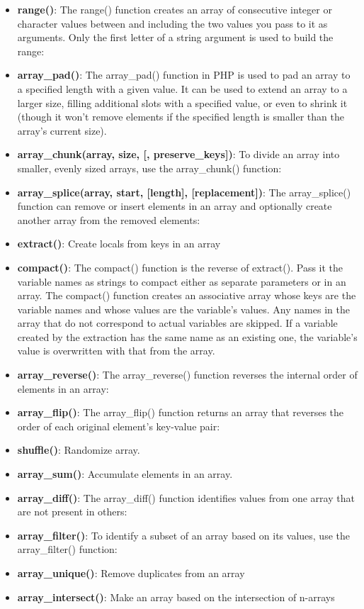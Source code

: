 \documentclass{report}
\begin{document}
\begin{itemize}
    \item \textbf{range()}: The range() function creates an array of consecutive integer or character values between and including the two values you pass to it as arguments. Only the first letter of a string argument is used to build the range:
    \item \textbf{array\_pad()}: The array\_pad() function in PHP is used to pad an array to a specified length with a given value. It can be used to extend an array to a larger size, filling additional slots with a specified value, or even to shrink it (though it won’t remove elements if the specified length is smaller than the array's current size).
    \item \textbf{array\_chunk(array, size, [, preserve\_keys])}: To divide an array into smaller, evenly sized arrays, use the array\_chunk() function:
    \item \textbf{array\_splice(array, start, [length], [replacement])}: The array\_splice() function can remove or insert elements in an array and optionally create another array from the removed elements:
    \item \textbf{extract()}: Create locals from keys in an array
    \item \textbf{compact()}: The compact() function is the reverse of extract(). Pass it the variable names as strings to compact either as separate parameters or in an array. The compact() function creates an associative array whose keys are the variable names and whose values are the variable’s values. Any names in the array that do not correspond to actual variables are skipped. If a variable created by the extraction has the same name as an existing one, the variable’s value is overwritten with that from the array.
    \item \textbf{array\_reverse()}: The array\_reverse() function reverses the internal order of elements in an array:
    \item \textbf{array\_flip()}: The array\_flip() function returns an array that reverses the order of each original element’s key-value pair:
    \item \textbf{shuffle()}: Randomize array.
    \item \textbf{array\_sum()}: Accumulate elements in an array.
    \item \textbf{array\_diff()}: The array\_diff() function identifies values from one array that are not present in others:
    \item \textbf{array\_filter()}: To identify a subset of an array based on its values, use the array\_filter() function:
    \item \textbf{array\_unique()}: Remove duplicates from an array
    \item \textbf{array\_intersect()}: Make an array based on the intersection of n-arrays
\end{itemize}
\end{document}

